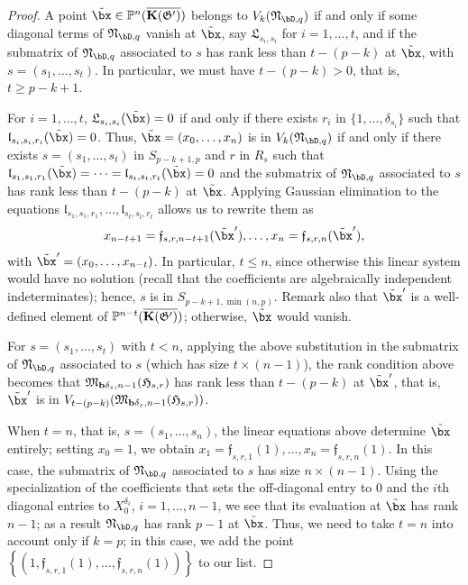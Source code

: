 \documentclass[12pt]{article}
\begin{document}
\begin{proof}
  A point $\tilde\bx \in \P^n(\KKGpbar)$ belongs to
  $V_k(\mathfrak{N}_{\bD,q})$ if and only if some diagonal terms of
  $\mathfrak{N}_{\bD,q}$ vanish at $\tilde\bx$, say
  $\mathfrak{L}_{s_i,s_i}$ for $i=1,\dots,t$, and if the
 submatrix of $\mathfrak{N}_{\bD,q}$ associated to $s$ has rank
  less than $t-(p-k)$ at $\tilde \bx$, with $s=(s_1,\dots,s_t)$.  In
  particular, we must have $t-(p-k) > 0$, that is, $t \ge p-k+1$.

  For $i=1,\dots, t$, $\mathfrak{L}_{s_i,s_i}(\tilde\bx)=0$ if and
  only if there exists $r_i$ in $\{1,\dots,\delta_{s_i}\}$ such that
  $\mathfrak{l}_{s_i,s_i,r_i}(\tilde\bx)=0$. Thus, $\tilde\bx=(x_0,\dots,x_n)$ is in
  $V_k(\mathfrak{N}_{\bD,q})$ if and only if there exists
  $s=(s_1,\dots,s_t)$ in $S_{p-k+1,p}$ and $r$ in $R_s$ such that
  $\mathfrak{l}_{s_1,s_1,r_1}(\tilde\bx)=\cdots=\mathfrak{l}_{s_t,s_t,r_t}(\tilde\bx)=0$
  and the submatrix of
  $\mathfrak{N}_{\bD,q}$ associated to $s$ has rank less than $t-(p-k)$ at $\tilde\bx$.  Applying Gaussian
  elimination to the equations
  $\mathfrak{l}_{s_1,s_1,r_1},\dots,\mathfrak{l}_{s_t,s_t,r_t}$  allows us to rewrite them as
  \begin{align*}
    x_{n-t+1}=\mathfrak{f}_{s,r,n-t+1}(\tilde\bx'),\dots,x_{n}=\mathfrak{f}_{s,r,n}(\tilde\bx'),
  \end{align*}
  with $\tilde\bx'=(x_0,\dots,x_{n-t})$.  In particular, $t \le n$,
  since otherwise this linear system would have no solution (recall that 
  the coefficients are algebraically independent indeterminates); hence,
  $s$ is in $S_{p-k+1,\min(n,p)}$. Remark also that $\tilde\bx'$ is a
  well-defined element of $\mathbb{P}^{n-t}(\overline{\mathbf{K}(\mathfrak{G}')})$; otherwise, $\tilde\bx$
  would vanish.

  For $s=(s_1,\dots,s_t)$ with $t < n$, applying the above
  substitution in the submatrix of $\mathfrak{N}_{\bD,q}$ associated
  to $s$ (which has size $t \times (n-1)$), the rank condition above
  becomes that $\mathfrak{M}_{\mathbf{b}\delta_s,n-1}(\mathfrak{H}_{s,r})$ has rank
  less than $t-(p-k)$ at $\tilde \bx'$, that is, $\tilde \bx'$ is in
  $V_{t-(p-k)}(\mathfrak{M}_{\mathbf{b}\delta_s,n-1}(\mathfrak{H}_{s,r}))$.  

  When $t=n$, that is, $s=(s_1,\dots,s_n)$, the linear equations above
  determine $\tilde\bx$ entirely; setting $x_0=1$, we obtain
  $x_{1}=\mathfrak{f}_{s,r,1}(1),\dots,x_{n}=\mathfrak{f}_{s,r,n}(1).$
  In this case, the submatrix of $\mathfrak{N}_{\bD,q}$ associated to
  $s$ has size $n \times (n-1)$. Using the specialization of the
  coefficients that sets the off-diagonal entry to $0$ and the $i$th
  diagonal entries to $X_0^{\delta_i}$, $i=1,\dots,n-1$, we see that its
  evaluation at $\tilde\bx$ has rank $n-1$; as a result
  $\mathfrak{N}_{\bD,q}$ has rank $p-1$ at $\tilde \bx$. Thus, we need
  to take $t=n$ into account only if $k=p$; in this case, we add the
  point $\left \{
  (1,\mathfrak{f}_{s,r,1}(1),\dots,\mathfrak{f}_{s,r,n}(1))\right \}$
  to our list.
\end{proof}
\end{document}
